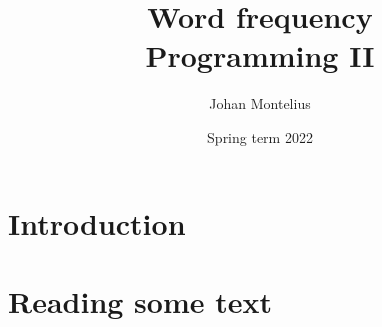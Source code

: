 \documentclass[a4paper,11pt]{article}
\begin{document}
\title{
    \textbf{Word frequency}\\
    \large{Programming II}
}
\author{Johan Montelius}
\date{Spring term 2022}
\maketitle
{}

\section*{Introduction}


\section*{Reading some text}
\end{document}

